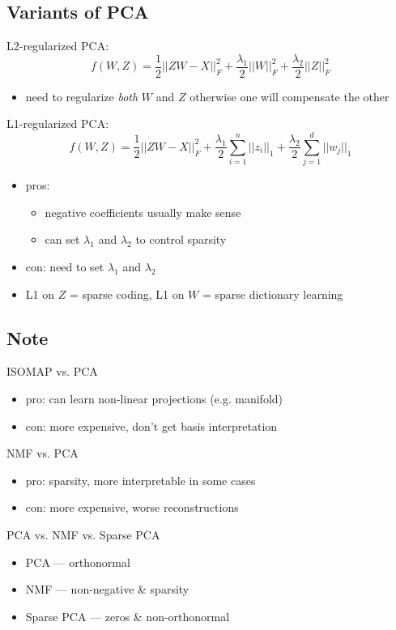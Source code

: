 \documentclass[10pt,landscape,a4paper]{article}
\begin{document}
\begin{multicols*}{5}
\subsection{Variants of PCA}
L2-regularized PCA:
\begin{dmath*}
    f(W,Z) = \frac{1}{2} ||ZW-X||_F^2 + \frac{\lambda_1}{2} ||W||_F^2 + \frac{\lambda_2}{2} ||Z||_F^2
\end{dmath*}
\begin{itemize}
    \item need to regularize \emph{both} \(W\) and \(Z\) otherwise one will compensate the other
\end{itemize}
L1-regularized PCA:
\begin{dmath*}
    f(W,Z) = \frac{1}{2} ||ZW-X||_F^2 + \frac{\lambda_1}{2} \sum_{i=1}^{n} ||z_i||_1 + \frac{\lambda_2}{2} \sum_{j=1}^{d} ||w_j||_1
\end{dmath*}
\begin{itemize}
    \item pros:
    \begin{itemize}
        \item negative coefficients usually make sense
        \item can set \(\lambda_1\) and \(\lambda_2\) to control sparsity
    \end{itemize}
    \item con: need to set \(\lambda_1\) and \(\lambda_2\)
    \item L1 on \(Z\) = sparse coding, L1 on \(W\) = sparse dictionary learning
\end{itemize}

\subsection{Note}
ISOMAP vs. PCA
\begin{itemize}
    \item pro: can learn non-linear projections (e.g. manifold)
    \item con: more expensive, don't get basis interpretation
\end{itemize}
NMF vs. PCA
\begin{itemize}
    \item pro: sparsity, more interpretable in some cases
    \item con: more expensive, worse reconstructions
\end{itemize}
PCA vs. NMF vs. Sparse PCA
\begin{itemize}
    \item PCA --- orthonormal
    \item NMF --- non-negative \& sparsity
    \item Sparse PCA --- zeros \& non-orthonormal
\end{itemize}


\end{multicols*}
\end{document}

